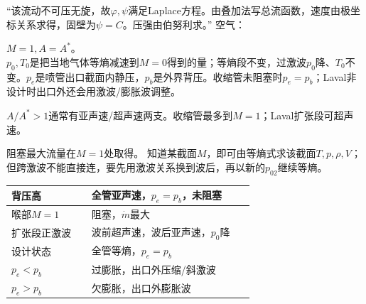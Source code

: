 “该流动不可压无旋，故$\varphi,\psi$满足Laplace方程。由叠加法写总流函数，速度由极坐标关系求得，固壁为$\psi=C$。压强由伯努利求。”
\schemelaval
{}
空气：

$M=1,A=A^*$。\\
$p_0,T_0$是把当地气体等熵减速到$M=0$得到的量；等熵段不变，过激波$p_0$降、$T_0$不变。$p_e$是喷管出口截面内静压，$p_b$是外界背压。收缩管未阻塞时$p_e=p_b$；Laval非设计时出口外还会用激波/膨胀波调整。

$A/A^*>1$通常有亚声速/超声速两支。收缩管最多到$M=1$；Laval扩张段可超声速。

阻塞最大流量在$M=1$处取得。
知道某截面$M$，即可由等熵式求该截面$T,p,\rho,V$；但跨激波不能直接连，要先用激波关系换到波后，再以新的$p_{02}$继续等熵。

\renewcommand{\arraystretch}{0.76}\begin{tabular}{|p{0.30\linewidth}|p{0.61\linewidth}|}
\hline 背压高 & 全管亚声速，$p_e=p_b$，未阻塞\\ \hline
喉部$M=1$ & 阻塞，$\dot m$最大\\ \hline
扩张段正激波 & 波前超声速，波后亚声速，$p_0$降\\ \hline
设计状态 & 全管等熵，$p_e=p_b$\\ \hline
$p_e<p_b$ & 过膨胀，出口外压缩/斜激波\\ \hline
$p_e>p_b$ & 欠膨胀，出口外膨胀波\\ \hline
\end{tabular}\renewcommand{\arraystretch}{1}

